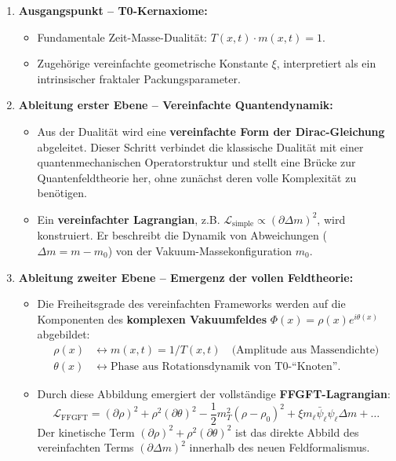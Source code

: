	\begin{enumerate}
		\item \textbf{Ausgangspunkt – T0-Kernaxiome:}
		\begin{itemize}
			\item Fundamentale Zeit-Masse-Dualität: \( T(x,t) \cdot m(x,t) = 1 \).
			\item Zugehörige vereinfachte geometrische Konstante \( \xi \), interpretiert als ein intrinsischer fraktaler Packungsparameter.
		\end{itemize}
		
		\item \textbf{Ableitung erster Ebene – Vereinfachte Quantendynamik:}
		\begin{itemize}
			\item Aus der Dualität wird eine \textbf{vereinfachte Form der Dirac-Gleichung} abgeleitet. Dieser Schritt verbindet die klassische Dualität mit einer quantenmechanischen Operatorstruktur und stellt eine Brücke zur Quantenfeldtheorie her, ohne zunächst deren volle Komplexität zu benötigen.
			\item Ein \textbf{vereinfachter Lagrangian}, z.B. \( \mathcal{L}_{\text{simple}} \propto (\partial \Delta m)^2 \), wird konstruiert. Er beschreibt die Dynamik von Abweichungen (\( \Delta m = m - m_0 \)) von der Vakuum-Massekonfiguration \( m_0 \).
		\end{itemize}
		
		\item \textbf{Ableitung zweiter Ebene – Emergenz der vollen Feldtheorie:}
		\begin{itemize}
			\item Die Freiheitsgrade des vereinfachten Frameworks werden auf die Komponenten des \textbf{komplexen Vakuumfeldes} \( \Phi(x) = \rho(x) e^{i\theta(x)} \) abgebildet:
			\begin{align*}
				\rho(x) &\leftrightarrow m(x,t) = 1/T(x,t) \quad \text{(Amplitude aus Massendichte)} \\
				\theta(x) &\leftrightarrow \text{Phase aus Rotationsdynamik von T0-``Knoten''}.
			\end{align*}
			\item Durch diese Abbildung emergiert der vollständige \textbf{FFGFT-Lagrangian}:
			\[
			\mathcal{L}_{\text{FFGFT}} = (\partial \rho)^2 + \rho^2 (\partial \theta)^2 - \frac{1}{2} m_T^2 (\rho - \rho_0)^2 + \xi m_\ell \bar{\psi}_\ell \psi_\ell \Delta m + \dots
			\]
			Der kinetische Term \( (\partial \rho)^2 + \rho^2 (\partial \theta)^2 \) ist das direkte Abbild des vereinfachten Terms \( (\partial \Delta m)^2 \) innerhalb des neuen Feldformalismus.
		\end{itemize}
	\end{enumerate}
	
